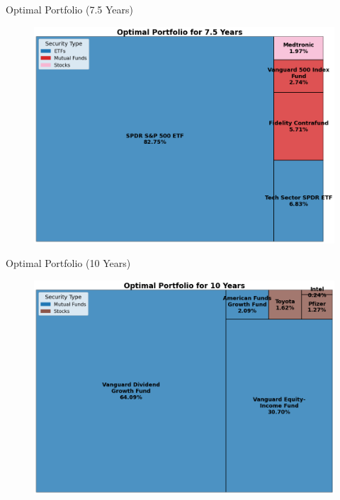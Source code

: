 \documentclass{beamer}
\begin{document}
\begin{frame}{Optimal Portfolio (7.5 Years)}
    \begin{figure}
        \centering
        \includegraphics[height=0.8\textheight]{optimal_portfolio_7_5_years.png}
    \end{figure}
\end{frame}

\begin{frame}{Optimal Portfolio (10 Years)}
    \begin{figure}
        \centering
        \includegraphics[height=0.8\textheight]{optimal_portfolio_10_years.png}
    \end{figure}
\end{frame}
\end{document}
